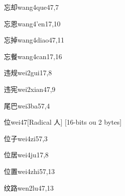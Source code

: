 \begin{verbete}{忘却}{wang4que4}{7,7}
\end{verbete}

\begin{verbete}{忘恩}{wang4'en1}{7,10}
\end{verbete}

\begin{verbete}{忘掉}{wang4diao4}{7,11}
\end{verbete}

\begin{verbete}{忘餐}{wang4can1}{7,16}
\end{verbete}

\begin{verbete}{违规}{wei2gui1}{7,8}
\end{verbete}

\begin{verbete}{违宪}{wei2xian4}{7,9}
\end{verbete}

\begin{verbete}{尾巴}{wei3ba5}{7,4}
\end{verbete}

\begin{verbete}{位}{wei4}{7}[Radical 人]
  [16-bits ou 2 bytes]
\end{verbete}

\begin{verbete}{位子}{wei4zi5}{7,3}
\end{verbete}

\begin{verbete}{位居}{wei4ju1}{7,8}
\end{verbete}

\begin{verbete}{位置}{wei4zhi5}{7,13}
\end{verbete}

\begin{verbete}{纹路}{wen2lu4}{7,13}
\end{verbete}

